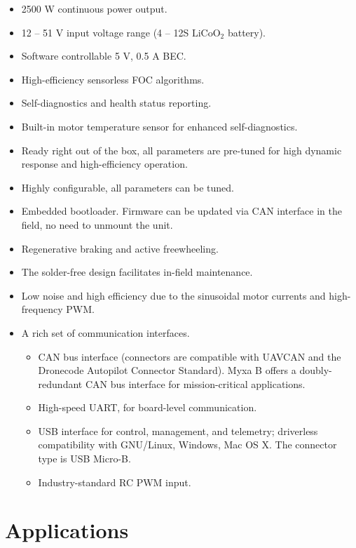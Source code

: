 \documentclass{../document_templates/documentation_template_latex/zubaxdoc}
\begin{document}
\begin{titlepage}
\begin{itemize}
    \item 2500 W continuous power output.
    \item 12 -- 51 V input voltage range (4 -- 12S $\text{LiCoO}_\text{2}$ battery).
    \item Software controllable 5 V, 0.5 A BEC.
    \item High-efficiency sensorless FOC algorithms.
    \item Self-diagnostics and health status reporting.
    \item Built-in motor temperature sensor for enhanced self-diagnostics.
    \item Ready right out of the box, all parameters are pre-tuned for high dynamic response and high-efficiency operation.
    \item Highly configurable, all parameters can be tuned.
    \item Embedded bootloader. Firmware can be updated via CAN interface in the field, no need to unmount the unit.
    \item Regenerative braking and active freewheeling.
    \item The solder-free design facilitates in-field maintenance.
    \item Low noise and high efficiency due to the sinusoidal \mbox{motor} currents and high-frequency PWM.
    \item A rich set of communication interfaces.
     \begin{itemize}
        \item CAN bus interface (connectors are compatible with UAVCAN and the Dronecode Autopilot Connector Standard).
         Myxa B offers a doubly-redundant CAN bus interface for mission-critical applications.
        \item High-speed UART, for board-level communication. 
        \item USB interface for control, management, and telemetry; driverless compatibility with GNU/Linux, Windows, 
        Mac OS X. The connector type is USB Micro-B.
        \item Industry-standard RC PWM input.
    \end{itemize}
\end{itemize}

\section*{Applications}


\end{titlepage}
\end{document}
